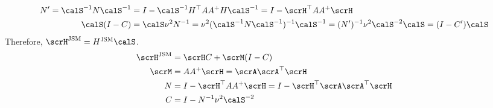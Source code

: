 \documentclass[12pt, leqno, letterpaper]{article}
\newcommand{\qeig}{\calS}
\newcommand{\Id}{I}
\begin{document}
\begin{enumerate}
{\begin{align*}
N' =  \qeig^{-1} N \qeig^{-1} &=  \Id - \qeig^{-1} H^\top AA^+ H \qeig^{-1}
 =  \Id - \scrH^\top AA^+ \scrH  \\
\qeig (\Id - C) &
= \qeig \nu^2 N^{-1} = \nu^2 (\qeig^{-1}N \qeig^{-1})^{-1}
\qeig^{-1}
= (N')^{-1} \nu^2 \qeig^{-2} \qeig  = (\Id - C') \qeig
\end{align*}
Therefore, $\scrH^{\text{JSM}} = H^\textsc{JSM} \qeig$. }
\begin{align*}
  \scrH^{\text{JSM}} &= \scrH C + \scrM (\Id - C) \\
 \scrM &=  A A^+ \scrH = \scrA \scrA^\top \scrH \\
 N &=  \Id - \scrH^\top AA^+ \scrH 
= \Id - \scrH^\top\scrA\scrA^\top \scrH \\
 C &= I - N^{-1} \nu^2 \qeig^{-2}
\end{align*}
\end{enumerate}
\end{document}
